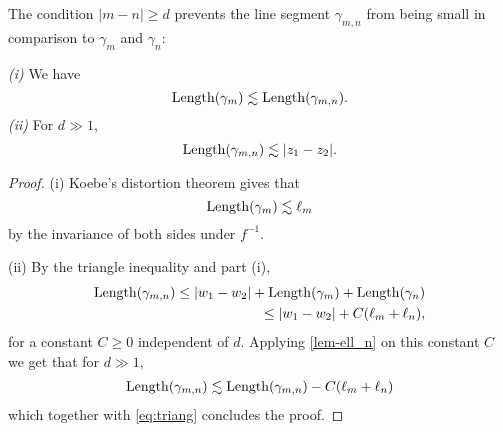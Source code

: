 %

The condition $|m-n| \geq d$ prevents the line segment $\gamma _{m,n}$ from being small in comparison to $\gamma_m$ and $\gamma_n$:
\begin{proposition} \leavevmode
	\emph{(i)} We have \begin{equation}
		\operatorname{Length}(\gamma_m) \lesssim \operatorname{Length}(\gamma_{m,n}).
	\end{equation}
	\emph{(ii)} For $d \gg 1$, 
	\begin{equation}
		\operatorname{Length}(\gamma_{m,n}) \lesssim |z_1-z_2|.
	\end{equation}
\end{proposition}

\begin{proof}
(i) 	Koebe's distortion theorem gives that 
\begin{equation}
		\operatorname{Length}(\gamma_m) \lesssim \ell_m
	\end{equation}
	by the invariance of both sides under $f^{-1}$.

(ii) By the triangle inequality and part (i),
\begin{align} \label{eq:triang}
	\begin{split}
	\Length(\gamma_{m,n}) \leq |w_1-w_2|+\Length(\gamma_m)+\Length(\gamma_n) %
	\\ \leq |w_1-w_2|+C(\ell_m + \ell_n),
	\end{split}
\end{align}
for a constant $C \geq 0$ independent of $d$. Applying \cref{lem-ell_n} on this constant $C$ we get that for $d \gg 1$, 
\begin{align*}
\operatorname{Length}(\gamma_{m,n}) \lesssim \operatorname{Length}(\gamma_{m,n}) - C(\ell_m + \ell _n)
\end{align*}
which together with \eqref{eq:triang} concludes the proof.
\end{proof}

